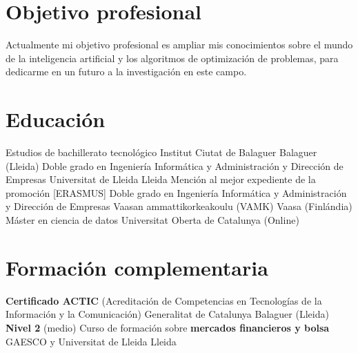 \documentclass{cv}
\begin{document}
\makecvtitle

\section{Objetivo profesional}
Actualmente mi objetivo profesional es ampliar mis conocimientos
sobre el mundo de la inteligencia artificial y los algoritmos de optimización
de problemas, para dedicarme en un futuro a la investigación en este campo.

\section{Educación}
	{Estudios de bachillerato tecnológico}
	{Institut Ciutat de Balaguer}
	{Balaguer (Lleida)}
	{}
	{}
	{Doble grado en Ingeniería Informática y Administración y Dirección de Empresas}
	{Universitat de Lleida}
	{Lleida}
	{Mención al mejor expediente de la promoción}
	{}
	{[ERASMUS] Doble grado en Ingeniería Informática y Administración y Dirección de Empresas}
	{Vaasan ammattikorkeakoulu (VAMK)}
	{Vaasa (Finlándia)}
	{}
	{}
	{Máster en ciencia de datos}
	{Universitat Oberta de Catalunya}
	{(Online)}
	{}
	{}

\section{Formación complementaria}
	{\textbf{Certificado ACTIC} (Acreditación de Competencias en Tecnologías de
		la Información y la Comunicación)}
	{Generalitat de Catalunya}
	{Balaguer (Lleida)}
	{\textbf{Nivel 2} (medio)}
	{}
	{Curso de formación sobre \textbf{mercados financieros y bolsa}}
	{GAESCO y Universitat de Lleida}
	{Lleida}
	{}
	{}
	{}
\end{document}
